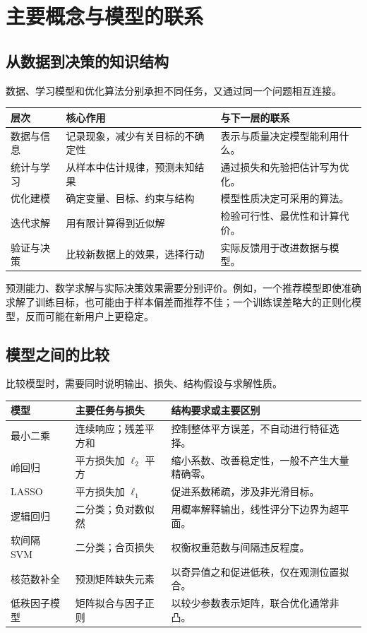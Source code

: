 \documentclass[UTF8,fontset=fandol,a4paper,12pt]{ctexart}
\theoremstyle{definition}
\begin{document}
\section{主要概念与模型的联系}
\subsection{从数据到决策的知识结构}
数据、学习模型和优化算法分别承担不同任务，又通过同一个问题相互连接。
\begin{center}
\begin{tabular}{p{}p{}p{}}
\toprule
层次 & 核心作用 & 与下一层的联系\\
\midrule
数据与信息 & 记录现象，减少有关目标的不确定性 & 表示与质量决定模型能利用什么。\\
统计与学习 & 从样本中估计规律，预测未知结果 & 通过损失和先验把估计写为优化。\\
优化建模 & 确定变量、目标、约束与结构 & 模型性质决定可采用的算法。\\
迭代求解 & 用有限计算得到近似解 & 检验可行性、最优性和计算代价。\\
验证与决策 & 比较新数据上的效果，选择行动 & 实际反馈用于改进数据与模型。\\
\bottomrule
\end{tabular}
\end{center}
预测能力、数学求解与实际决策效果需要分别评价。例如，一个推荐模型即使准确求解了训练目标，也可能由于样本偏差而推荐不佳；一个训练误差略大的正则化模型，反而可能在新用户上更稳定。

\subsection{模型之间的比较}
比较模型时，需要同时说明输出、损失、结构假设与求解性质。
\begin{center}
\small
\begin{tabular}{p{}p{}p{}}
\toprule
模型 & 主要任务与损失 & 结构要求或主要区别\\
\midrule
最小二乘 & 连续响应；残差平方和 & 控制整体平方误差，不自动进行特征选择。\\
岭回归 & 平方损失加 $\ell_2$ 平方 & 缩小系数、改善稳定性，一般不产生大量精确零。\\
LASSO & 平方损失加 $\ell_1$ & 促进系数稀疏，涉及非光滑目标。\\
逻辑回归 & 二分类；负对数似然 & 用概率解释输出，线性评分下边界为超平面。\\
软间隔 SVM & 二分类；合页损失 & 权衡权重范数与间隔违反程度。\\
核范数补全 & 预测矩阵缺失元素 & 以奇异值之和促进低秩，仅在观测位置拟合。\\
低秩因子模型 & 矩阵拟合与因子正则 & 以较少参数表示矩阵，联合优化通常非凸。\\
\bottomrule
\end{tabular}
\end{center}
\end{document}

